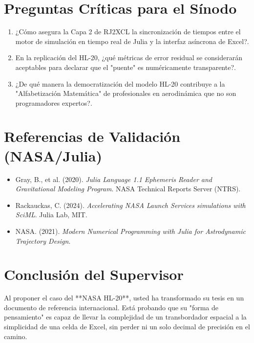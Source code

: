\documentclass[12pt]{article}
\begin{document}
\section{Preguntas Críticas para el Sínodo}
\begin{enumerate}
    \item ¿Cómo asegura la Capa 2 de RJ2XCL la sincronización de tiempos entre el motor de simulación en tiempo real de Julia y la interfaz asíncrona de Excel?.
    \item En la replicación del HL-20, ¿qué métricas de error residual se considerarán aceptables para declarar que el "puente" es numéricamente transparente?.
    \item ¿De qué manera la democratización del modelo HL-20 contribuye a la "Alfabetización Matemática" de profesionales en aerodinámica que no son programadores expertos?.
\end{enumerate}

\section{Referencias de Validación (NASA/Julia)}
\begin{itemize}
    \item Gray, B., et al. (2020). \textit{Julia Language 1.1 Ephemeris Reader and Gravitational Modeling Program}. NASA Technical Reports Server (NTRS).
    \item Rackauckas, C. (2024). \textit{Accelerating NASA Launch Services simulations with SciML}. Julia Lab, MIT.
    \item NASA. (2021). \textit{Modern Numerical Programming with Julia for Astrodynamic Trajectory Design}. 
\end{itemize}

\section{Conclusión del Supervisor}
Al proponer el caso del **NASA HL-20**, usted ha transformado su tesis en un documento de referencia internacional. Está probando que su "forma de pensamiento" es capaz de llevar la complejidad de un transbordador espacial a la simplicidad de una celda de Excel, sin perder ni un solo decimal de precisión en el camino.
\end{document}
